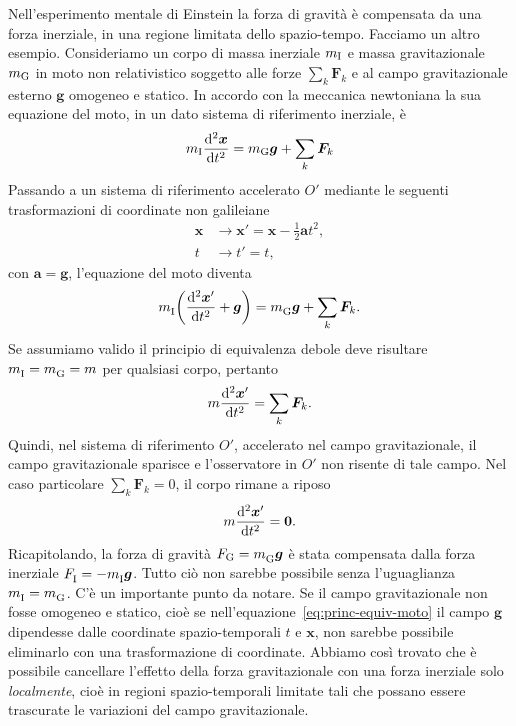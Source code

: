 Nell'esperimento mentale di Einstein la forza di gravità è compensata da una
forza inerziale, in una regione limitata dello spazio-tempo.  Facciamo un altro
esempio.  Consideriamo un corpo di massa inerziale $m_{\textup{I}}$ e massa
gravitazionale $m_{\textup{G}}$ in moto non relativistico soggetto alle forze
$\sum_{k} \bm{F}_{k}$ e al campo gravitazionale esterno $\bm{g}$ omogeneo e
statico.  In accordo con la meccanica newtoniana la sua equazione del moto, in
un dato sistema di riferimento inerziale, è
\begin{equation}
  \label{eq:princ-equiv-moto}
  m_{\textup{I}}\toder[2]{\bm{x}}{t} = m_{\textup{G}}\bm{g}+\sum_{k} \bm{F}_{k}
\end{equation}
Passando a un sistema di riferimento accelerato $O'$ mediante le seguenti
trasformazioni di coordinate non galileiane
\begin{subequations}
  \begin{align}
    \bm{x} &\to \bm{x}'=\bm{x}-{\frac{1}{2}}\bm{a}{t^{2}}, \\
    t &\to t' =t,
  \end{align}
\end{subequations}
con $\bm{a}=\bm{g}$, l'equazione del moto diventa
\begin{equation}
  m_{\textup{I}}^{}\bigg(\toder[2]{\bm{x}'}{t}+\bm{g}\bigg) =
  m_{\textup{G}}^{}\bm{g}+\sum_{k} \bm{F}_{k}.
\end{equation}
Se assumiamo valido il principio di equivalenza debole deve risultare
$m_{\textup{I}}^{}=m_{\textup{G}}^{}=m$ per qualsiasi corpo, pertanto
\begin{equation}
  m\toder[2]{\bm{x}'}{t} = \sum_{k} \bm{F}_{k}.
\end{equation}
Quindi, nel sistema di riferimento $O'$, accelerato nel campo gravitazionale, il
campo gravitazionale sparisce e l'osservatore in $O'$ non risente di tale campo.
Nel caso particolare $\sum_{k} \bm{F}_{k} = 0$, il corpo rimane a riposo
\begin{equation}
  m\toder[2]{\bm{x}'}{t} = \bm{0}.
\end{equation}
Ricapitolando, la forza di gravità $F_{\textup{G}} = m_{\textup{G}}^{}\bm{g}$
è stata compensata dalla forza inerziale
$F_{\textup{I}}^{}=-m_{\textup{I}}^{}\bm{g}$.
Tutto ciò non sarebbe possibile senza l'uguaglianza
$m_{\textup{I}}^{}=m_{\textup{G}}^{}$.
C'è un importante punto da notare.  Se il campo gravitazionale non fosse
omogeneo e statico, cioè se nell'equazione~\eqref{eq:princ-equiv-moto} il campo
$\bm{g}$ dipendesse dalle coordinate spazio-temporali $t$ e $\bm{x}$, non
sarebbe possibile eliminarlo con una trasformazione di coordinate.  Abbiamo così
trovato che è possibile cancellare l'effetto della forza gravitazionale con una
forza inerziale solo \emph{localmente}, cioè in regioni spazio-temporali
limitate tali che possano essere trascurate le variazioni del campo
gravitazionale.

